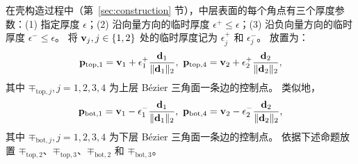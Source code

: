 在壳构造过程中（第~\ref{sec:construction} 节），中层表面的每个角点有三个厚度参数：(1) 指定厚度 $\epsilon$；(2) 沿向量方向的临时厚度 $\epsilon^{+} \leq \epsilon$；(3) 沿负向量方向的临时厚度 $\epsilon^{-} \leq \epsilon$。
%
将 $\mathbf{v}_j, j\in\{1,2\}$ 处的临时厚度记为 $\epsilon_j^{+}$ 和 $\epsilon_j^{-}$。
%
放置为：
$$\mathbf{p}_{\text{top},1} = \mathbf{v}_1 + \epsilon_1^{+} \frac{\mathbf{d}_1}{\|\mathbf{d}_1\|_2}, \,\, \mathbf{p}_{\text{top},4} = \mathbf{v}_2 + \epsilon_2^{+} \frac{\mathbf{d}_2}{\|\mathbf{d}_2\|_2},$$ 其中 $\mp_{\text{top},j}, j=1,2,3,4$ 为上层 B\'{e}zier 三角面一条边的控制点。
类似地，$$\mathbf{p}_{\text{bot},1} = \mathbf{v}_1 - \epsilon_1^{-} \frac{\mathbf{d}_1}{\|\mathbf{d}_1\|_2}, \,\,\mathbf{p}_{\text{bot},4} = \mathbf{v}_2 - \epsilon_2^{-} \frac{\mathbf{d}_2}{\|\mathbf{d}_2\|_2},$$ 其中 $\mp_{\text{bot},j}, j=1,2,3,4$ 为下层 B\'{e}zier 三角面一条边的控制点。
%
依据下述命题放置 $\mp_{\text{top},2}$、$\mp_{\text{top},3}$、$\mp_{\text{bot},2}$ 和 $\mp_{\text{bot},3}$。
%
